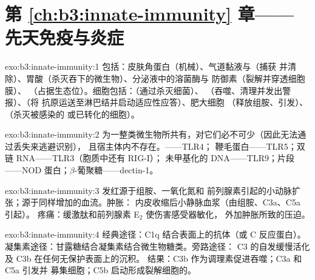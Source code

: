\section*{第 \ref{ch:b3:innate-immunity} 章——先天免疫与炎症}

\begin{solution}{exo:b3:innate-immunity:1}
包括：皮肤角蛋白（机械）、气道黏液与（捕获
并清除）、胃酸（杀灭吞下的微生物）、分泌液中的溶菌酶与
防御素（裂解并穿透细胞膜）、
（占据生态位）。细胞包括：（通过杀灭细菌）、
（吞噬、清理并发出警报）、（将
抗原运送至淋巴结并启动适应性应答）、肥大细胞
（释放组胺、引发）、（杀灭被感染的
或已转化的细胞）。
\end{solution}

\begin{solution}{exo:b3:innate-immunity:2}
为一整类微生物所共有，对它们必不可少（因此无法通过丢失来逃避识别），
且宿主体内不存在。——TLR4；
鞭毛蛋白——TLR5；双链 RNA——TLR3（胞质中还有 RIG-I）；
未甲基化的  DNA——TLR9；片段——NOD
蛋白；$\beta$-葡聚糖——dectin-1。
\end{solution}

\begin{solution}{exo:b3:innate-immunity:3}
发红源于组胺、一氧化氮和
前列腺素引起的小动脉扩张；源于同样增加的血流。肿胀：
内皮收缩后小静脉血浆（由组胺、C3a、C5a 引起）。
疼痛：缓激肽和前列腺素 E$_{2}$ 使伤害感受器敏化，
外加肿胀所致的压迫。
\end{solution}

\begin{solution}{exo:b3:innate-immunity:4}
经典途径：C1q 结合表面上的抗体（或 C 反应蛋白）。
凝集素途径：甘露糖结合凝集素结合微生物糖类。旁路途径：
C3 的自发缓慢活化及 C3b 在任何无保护表面上的沉积。
结果：C3b 作为调理素促进吞噬；C3a 和 C5a 引发并
募集细胞；C5b 启动形成裂解细胞的。
\end{solution}

